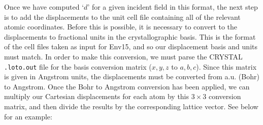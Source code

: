 \documentclass[10pt]{article}
\begin{document}




Once we have computed `$d$' for a given incident field in this format, the next step is to add the displacements to the unit cell file containing all of the relevant atomic coordinates. Before this is possible, it is necessary to convert to the displacements to fractional units in the crystallographic basis. This is the format of the cell files taken as input for Env15, and so our displacement basis and units must match. In order to make this conversion, we must parse the CRYSTAL \texttt{.loto.out} file for the basis conversion matrix ($x, y, z$ to $a, b , c$). Since this matrix is given in Angstrom units, the displacements must be converted from a.u. (Bohr) to Angstrom. Once the Bohr to Angstrom conversion has been applied, we can multiply our Cartesian displacements for each atom by this $3\times 3$ conversion matrix, and then divide the results by the corresponding lattice vector. See below for an example:
\\
\end{document}
